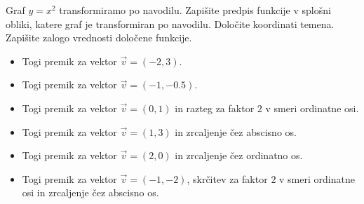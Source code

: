         \begin{naloga}
            Graf $y=x^2$ transformiramo po navodilu.
            Zapišite predpis funkcije v splošni obliki, katere graf je transformiran po navodilu.
            Določite koordinati temena. 
            Zapišite zalogo vrednosti določene funkcije.
            
                \begin{itemize}
                    \item Togi premik za vektor $\vec{v}=(-2,3)$.
                    \item Togi premik za vektor $\vec{v}=(-1,-0.5)$.
                    \item Togi premik za vektor $\vec{v}=(0,1)$ in razteg za faktor $2$ v smeri ordinatne osi.
                    \item Togi premik za vektor $\vec{v}=(1,3)$ in zrcaljenje čez abscisno os.
                    \item Togi premik za vektor $\vec{v}=(2,0)$ in zrcaljenje čez ordinatno os.
                    \item Togi premik za vektor $\vec{v}=(-1,-2)$, skrčitev za faktor $2$ v smeri ordinatne osi in zrcaljenje čez abscisno os.
                \end{itemize}

        \end{naloga}
    


